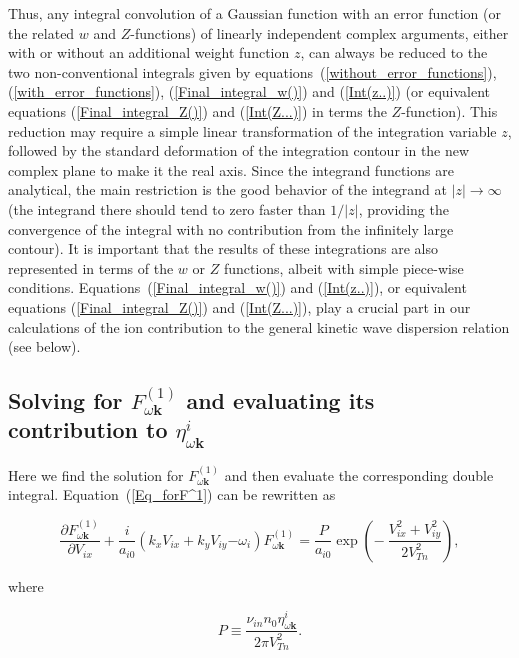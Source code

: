 \documentclass[draft]{agujournal2019}
\renewcommand{\vec}{\mathbf}
\begin{document}
{Thus, any integral convolution of a Gaussian function with an error function (or the related $w$ and $Z$-functions) of  
linearly independent complex arguments, either with or without an additional weight function $z$,  can 
always be reduced to the two non-conventional integrals given by equations~(\ref{without_error_functions}), 
(\ref{with_error_functions}), (\ref{Final_integral_w()}) 
and (\ref{Int(z..)}) (or equivalent equations (\ref{Final_integral_Z()}) and (\ref{Int(Z...)}) 
in terms the $Z$-function). This reduction may require a simple linear transformation of the integration 
variable $z$, followed by the standard deformation of 
the integration contour in the new complex plane to make it the real axis. 
Since the integrand functions are analytical, the main restriction 
is the good behavior of the integrand at $|z|\rightarrow\infty$ (the integrand there should tend to zero faster 
than $1/|z|$, providing the convergence of the integral with no contribution from the infinitely large contour). 
It is important that the results of these integrations are also represented in terms 
of the $w$ or $Z$ functions, albeit with simple piece-wise conditions.
Equations~(\ref{Final_integral_w()}) and (\ref{Int(z..)}), or equivalent equations 
(\ref{Final_integral_Z()}) and (\ref{Int(Z...)}), play a crucial part in our calculations 
of the ion contribution to the general kinetic wave dispersion relation 
(see below). 

\subsection{Solving for $F_{\omega\vec{k}}^{(1)}$ and evaluating its
contribution to $\eta_{\omega\vec{k}}^{i}$%
\label{Solving for F_1 and evaluating its contribution to eta_i}}

Here we find the solution for $F_{\omega\vec{k}}^{(1)}$ and then evaluate the
corresponding double integral. Equation~(\ref{Eq_forF^1}) can be rewritten as
\begin{linenomath*}
\begin{equation}
\frac{\partial F_{\omega\vec{k}}^{(1)}}{\partial V_{ix}}+\frac{i}{a_{i0}%
}(k_{x}V_{ix}+k_{y}V_{iy}\mathbf{-}\omega_{i})F_{\omega\vec{k}}^{(1)}=\frac
{P}{a_{i0}}\exp\left(  -\ \frac{V_{ix}^{2}+V_{iy}^{2}}{2V_{Tn}^{2}}\right)  ,
\label{F(1)_viua_rho,P_Review}
\end{equation}
\end{linenomath*}
where
\begin{linenomath*}
\begin{equation}
P\equiv\frac{\nu_{in}n_{0}\eta_{\omega\vec{k}}^{i}}{2\pi V_{Tn}^{2}}.
\label{P}
\end{equation}
\end{linenomath*}


}
\end{document}
